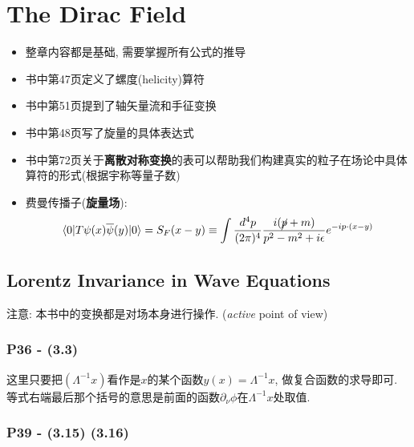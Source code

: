 \chapter{The Dirac Field}

\begin{itemize}
  \item \textbf{}整章内容都是基础, 需要掌握所有公式的推导
  \item \textbf{}书中第47页定义了螺度(helicity)算符
  \item \textbf{}书中第51页提到了轴矢量流和手征变换
  \item \textbf{}书中第48页写了旋量的具体表达式
  \item \textbf{}书中第72页关于\textbf{离散对称变换}的表可以帮助我们构建真实的粒子在场论中具体算符的形式(根据宇称等量子数)
  \item \textbf{}费曼传播子(\textbf{旋量场}):
        \begin{equation*}
          \langle 0|T\psi(x)\overline{\psi}(y)|0 \rangle = S_F(x-y)\equiv \int \frac{d^4 p}{(2\pi)^4} \frac{i(\cancel{p} + m)}{p^2 - m^2 +i\epsilon} e^{-ip\cdot (x-y)}
        \end{equation*}
\end{itemize}
\pagestyle{general}

\section{Lorentz Invariance in Wave Equations}

注意: 本书中的变换都是对场本身进行操作. (\textit{active} point of view)

\subsection{P36 - (3.3)}

这里只要把$(\Lambda^{-1}x)$看作是$x$的某个函数$y(x) = \Lambda^{-1}x$, 做复合函数的求导即可.
等式右端最后那个括号的意思是前面的函数$\partial_{\nu}\phi$在$\Lambda^{-1}x$处取值.

\subsection{P39 - (3.15) (3.16)}

